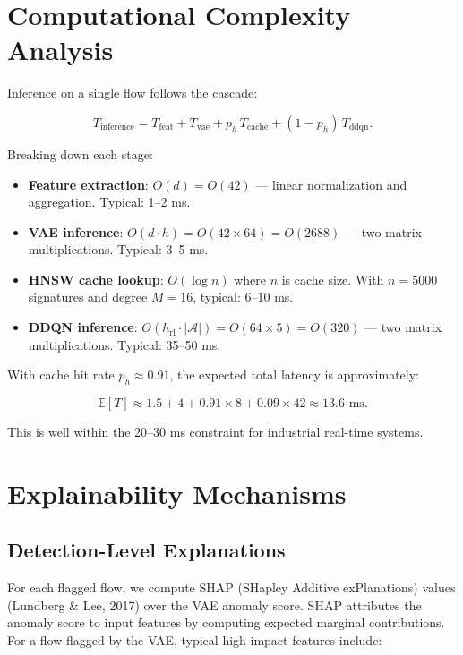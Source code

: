 \documentclass[preprint,12pt]{elsarticle}
\begin{document}
\section{Computational Complexity Analysis}
\label{sec:complexity}

Inference on a single flow follows the cascade:

\begin{equation}
T_{\text{inference}} = T_{\text{feat}} + T_{\text{vae}} + p_h \, T_{\text{cache}} + (1-p_h) \, T_{\text{ddqn}}.
\label{eq:total_time}
\end{equation}

Breaking down each stage:

\begin{itemize}[leftmargin=1.2em]
    \item \textbf{Feature extraction}: $O(d) = O(42)$ --- linear normalization and aggregation. Typical: 1--2 ms.
    \item \textbf{VAE inference}: $O(d \cdot h) = O(42 \times 64) = O(2688)$ --- two matrix multiplications. Typical: 3--5 ms.
    \item \textbf{HNSW cache lookup}: $O(\log n)$ where $n$ is cache size. With $n = 5000$ signatures and degree $M = 16$, typical: 6--10 ms.
    \item \textbf{DDQN inference}: $O(h_{\text{rl}} \cdot |\mathcal{A}|) = O(64 \times 5) = O(320)$ --- two matrix multiplications. Typical: 35--50 ms.
\end{itemize}

With cache hit rate $p_h \approx 0.91$, the expected total latency is approximately:

\[
\mathbb{E}[T] \approx 1.5 + 4 + 0.91 \times 8 + 0.09 \times 42 \approx 13.6 \text{ ms}.
\]

This is well within the 20--30 ms constraint for industrial real-time systems.

\section{Explainability Mechanisms}
\label{sec:explainability}

\subsection{Detection-Level Explanations}

For each flagged flow, we compute SHAP (SHapley Additive exPlanations) values (Lundberg \& Lee, 2017) over the VAE anomaly score. SHAP attributes the anomaly score to input features by computing expected marginal contributions. For a flow flagged by the VAE, typical high-impact features include:
\end{document}

